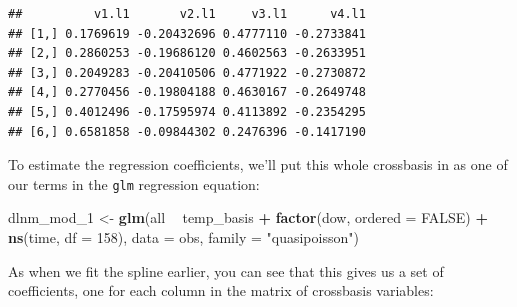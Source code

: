 \documentclass[
]{book}
\newenvironment{Shaded}{\begin{snugshade}}{\end{snugshade}}
\newcommand{\DataTypeTok}[1]{\textcolor[rgb]{0.13,0.29,0.53}{#1}}
\newcommand{\DecValTok}[1]{\textcolor[rgb]{0.00,0.00,0.81}{#1}}
\newcommand{\KeywordTok}[1]{\textcolor[rgb]{0.13,0.29,0.53}{\textbf{#1}}}
\newcommand{\NormalTok}[1]{#1}
\newcommand{\OperatorTok}[1]{\textcolor[rgb]{0.81,0.36,0.00}{\textbf{#1}}}
\newcommand{\OtherTok}[1]{\textcolor[rgb]{0.56,0.35,0.01}{#1}}
\newcommand{\StringTok}[1]{\textcolor[rgb]{0.31,0.60,0.02}{#1}}
\begin{document}
\begin{Shaded}
\end{Shaded}

\begin{verbatim}
##          v1.l1       v2.l1     v3.l1      v4.l1
## [1,] 0.1769619 -0.20432696 0.4777110 -0.2733841
## [2,] 0.2860253 -0.19686120 0.4602563 -0.2633951
## [3,] 0.2049283 -0.20410506 0.4771922 -0.2730872
## [4,] 0.2770456 -0.19804188 0.4630167 -0.2649748
## [5,] 0.4012496 -0.17595974 0.4113892 -0.2354295
## [6,] 0.6581858 -0.09844302 0.2476396 -0.1417190
\end{verbatim}

To estimate the regression coefficients, we'll put this whole crossbasis in as one of
our terms in the \texttt{glm} regression equation:

\begin{Shaded}
\begin{Highlighting}[]
\NormalTok{dlnm_mod_}\DecValTok{1}\NormalTok{ <-}\StringTok{ }\KeywordTok{glm}\NormalTok{(all }\OperatorTok{~}\StringTok{ }\NormalTok{temp_basis }\OperatorTok{+}\StringTok{ }\KeywordTok{factor}\NormalTok{(dow, }\DataTypeTok{ordered =} \OtherTok{FALSE}\NormalTok{) }\OperatorTok{+}
\StringTok{                          }\KeywordTok{ns}\NormalTok{(time, }\DataTypeTok{df =} \DecValTok{158}\NormalTok{), }
                        \DataTypeTok{data =}\NormalTok{ obs, }\DataTypeTok{family =} \StringTok{"quasipoisson"}\NormalTok{)}
\end{Highlighting}
\end{Shaded}

As when we fit the spline earlier, you can see that this gives us a set of coefficients,
one for each column in the matrix of crossbasis variables:

\begin{Shaded}
\end{Shaded}
\end{document}
